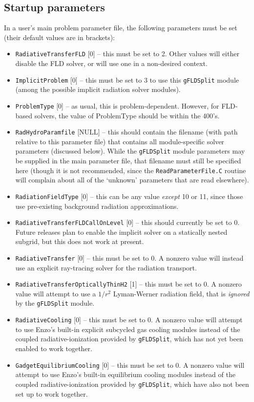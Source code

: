 \documentclass[letterpaper,10pt]{article}
\renewcommand{\(}{\left(}
\renewcommand{\)}{\right)}
\begin{document}
\subsection{Startup parameters}

In a user's main problem parameter file, the following parameters
must be set (their default values are in brackets):
\begin{itemize}
\item {\tt RadiativeTransferFLD} [0] -- this must be set to 2.  Other
  values will either disable the FLD solver, or will use one in a
  non-desired context.
\item {\tt ImplicitProblem} [0] -- this must be set to 3 to use this
  {\tt gFLDSplit} module (among the possible implicit radiation solver
  modules).
\item {\tt ProblemType} [0] -- as usual, this is problem-dependent.
  However, for FLD-based solvers, the value of ProblemType
  should be within the 400's.
\item {\tt RadHydroParamfile} [NULL] -- this should contain the filename
  (with path relative to this parameter file) that contains all
  module-specific solver parameters (discussed below).  While the 
  {\tt gFLDSplit} module parameters may be supplied in the main
  parameter file, that filename must still be specified here (though
  it is not recommended, since the {\tt ReadParameterFile.C} routine
  will complain about all of the `unknown' parameters that are read
  elsewhere).
\item {\tt RadiationFieldType} [0] -- this can be any value {\em except}
  10 or 11, since those use pre-existing background radiation
  approximations.
\item {\tt RadiativeTransferFLDCallOnLevel} [0] -- this should currently
  be set to 0.  Future releases plan to enable the implicit solver on
  a statically nested subgrid, but this does not work at present.
\item {\tt RadiativeTransfer} [0] -- this must be set to 0.  A nonzero
  value will instead use an explicit ray-tracing solver for the
  radiation transport. 
\item {\tt RadiativeTransferOpticallyThinH2} [1] -- this must be set
  to 0.  A nonzero value will attempt to use a $1/r^2$ Lyman-Werner
  radiation field, that is {\em ignored} by the {\tt gFLDSplit} module.
\item {\tt RadiativeCooling} [0] -- this must be set to 0.  A nonzero
  value will attempt to use Enzo's built-in explicit subcycled gas
  cooling modules instead of the coupled radiative-ionization provided
  by {\tt gFLDSplit}, which has not yet been enabled to work together. 
\item {\tt GadgetEquilibriumCooling} [0] -- this must be set to 0.  A
  nonzero value will attempt to use Enzo's built-in equilibrium cooling
  modules instead of the coupled radiative-ionization provided by 
  {\tt gFLDSplit}, which have also not been set up to work together. 
\end{itemize}
\end{document}
